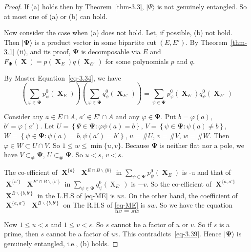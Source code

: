 \documentclass[a4paper,12pt]{article}
\DeclareMathOperator{\x}{\mathrm{X}}
\theoremstyle{definition}
\theoremstyle{underlinethm}
\theoremstyle{definition}
\begin{document}
\begin{proof}
If (a) holds then by Theorem~\ref{thm-3.3}, $| \Psi \rangle$ is not genuinely entangled. So at most one of (a) or (b) can hold.

Now consider the case when (a) does not hold. Let, if possible, (b) not hold. Then $|\boldsymbol{\Psi} \rangle$ is a product vector in some bipartite cut $(E, E')$. By Theorem~\ref{thm-3.1} (ii), and its proof, $\boldsymbol{\Psi}$ is decomposable via $E$ and $F_{\boldsymbol{\Psi}}(\boldsymbol{\x}) = p(\boldsymbol{\x}_{E}) q (\boldsymbol{\x}_{E'})$ for some polynomials $p$ and $q$.

By Master Equation~\ref{eq-3.34}, we have
\begin{equation}
\left(\sum_{\psi \in \boldsymbol{\Psi}} p_{\psi}^{0}(\boldsymbol{\x}_{E})\right) \left(\sum_{\psi \in \boldsymbol{\Psi}} q_{\psi}^{0} (\boldsymbol{\x}_{E'}) \right) = \sum_{\psi \in \boldsymbol{\Psi}} p_{\psi}^{0}(\boldsymbol{\x}_{E}) q_{\psi}^{0}(\boldsymbol{\x}_{E'})\tag{ME}\label{eq-ME}
\end{equation}
 
Consider any $a \in E \cap A$, $a' \in E' \cap A$ and any $\varphi \in \boldsymbol{\Psi}$. Put $b = \varphi(a)$, $b' = \varphi(a')$. Let $U = \left\{\Psi \in \boldsymbol{\Psi} : \varphi \psi(a) = b \right\}$, $V= \left\{\psi \in \boldsymbol{\Psi} : \psi(a) \neq b \right\}$, $W = \left\{\psi \in \boldsymbol{\Psi} : \psi(a) = b, \psi(a') = b'\right\}$,  $u =\# U$, $v = \# V$, $w = \# W$. Then $\varphi \in W \subset U \cap V$. So $1 \leq w \leq \min \{u, v\}$. Because $\boldsymbol{\Psi}$ is neither flat nor a pole, we have $V \subset_{\neq} \boldsymbol{\Psi}$, $U \subset_{\#} \boldsymbol{\Psi}$. So $u < s$, $v < s$.
 
The co-efficient of $\boldsymbol{\x}^{\{a\}}$ $\boldsymbol{\x}^{E \cap B \smallsetminus \{b\}}$ in $\sum_{\psi \in \boldsymbol{\Psi}} p_{\psi}^{0}(\boldsymbol{\x}_{E})$ is -u and that of $\boldsymbol{\x}^{\{a'\}}$ $\boldsymbol{\x}^{E' \cap B \smallsetminus \{b'\}}$ in $\sum_{\psi \in \boldsymbol{\Psi}} q_{\psi}^{0}(\x_{E'})$ is $-v$. So the co-efficient of $\boldsymbol{\x}^{\{a, a'\}}$ $\boldsymbol{\x}^{B \smallsetminus \{b, b'\}}$ in the L.H.S of \eqref{eq-ME} is $uv$. On the other hand, the coefficient of $\boldsymbol{\x}^{\{a, a'\}}$ $\boldsymbol{\x}^{B \smallsetminus \{b, b'\}}$ on  The R.H.S of \eqref{eq-ME} is $sw$. So we have the equation 
\begin{equation}
uv=sw \tag{3.39}\label{eq-3.39}
\end{equation}

Now $1 \leq u < s$ and $1 \leq v < s$. So $s$ cannot be a factor of $u$ or $v$. So if $s$ is a prime, then $s$ cannot be a factor of $uv$. This contradicts~\eqref{eq-3.39}. Hence $| \boldsymbol{\Psi} \rangle$ is genuinely entangled, i.e., (b) holds.
 
\end{proof}
\end{document}
